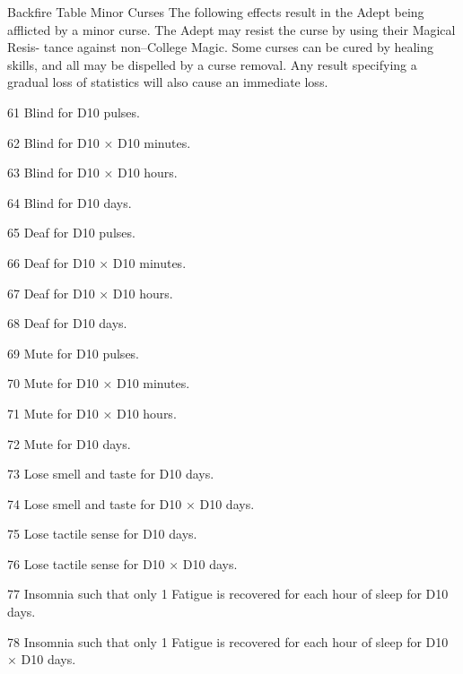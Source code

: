 \begin{Chapter}{Backfire Table}
Minor Curses The following effects result in the 
Adept being afflicted by a minor curse. The Adept 
may resist the curse by using their Magical Resis-
tance against non–College Magic. Some curses can 
be cured by healing skills, and all may be dispelled 
by a curse removal. Any result specifying a gradual 
loss of statistics will also cause an immediate loss. 

\begin{Description}

\item[61]  Blind for D10 pulses. 

\item[62] Blind for D10 × D10 minutes. 

\item[63] Blind for D10 × D10 hours. 

\item[64] Blind for D10 days. 

\item[65] Deaf for D10 pulses. 

\item[66] Deaf for D10 × D10 minutes. 

\item[67] Deaf for D10 × D10 hours. 

\item[68] Deaf for D10 days. 

\item[69] Mute for D10 pulses. 

\item[70] Mute for D10 × D10 minutes. 

\item[71] Mute for D10 × D10 hours. 

\item[72] Mute for D10 days. 

\item[73] Lose smell and taste for D10 days. 

\item[74] Lose smell and taste for D10 × D10 days. 

\item[75] Lose tactile sense for D10 days. 

\item[76] Lose tactile sense for D10 × D10 days. 

\item[77] Insomnia such that only 1 Fatigue is recovered for each hour
  of sleep for D10 days.

\item[78] Insomnia such that only 1 Fatigue is recovered for each hour
  of sleep for D10 × D10 days.


\end{Description}
\end{Chapter}
